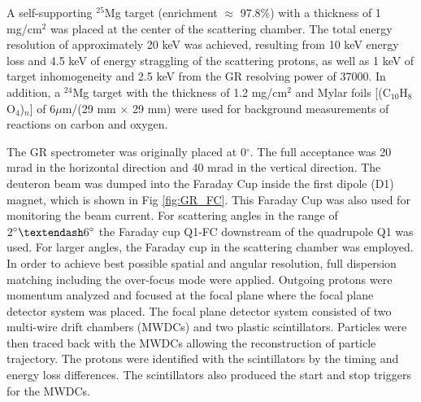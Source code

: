 A self-supporting $^{25}$Mg target (enrichment $\approx$ 97.8$\%$) with a thickness of 1 mg/cm$^2$ was placed at the center of the scattering chamber. The total energy resolution of approximately 20 keV was  achieved, resulting from 10 keV energy loss and 4.5 keV of energy straggling of the scattering protons, as well as 1 keV of target inhomogeneity and 2.5 keV from the GR resolving power of 37000. In addition, a $^{24}$Mg target with the thickness of 1.2 mg/cm$^2$ and Mylar foils [(C$_{10}$H$_8$O$_4$)$_n$] of 6$\mu$m/(29 mm $\times$ 29 mm) were used for background measurements of reactions on carbon and oxygen.

The GR spectrometer was originally placed at 0$^\circ$. The full acceptance was 20 mrad in the horizontal direction and 40 mrad in the vertical direction. The deuteron beam was dumped into the Faraday Cup inside the first dipole (D1) magnet, which is shown in Fig \ref{fig:GR_FC}. This Faraday Cup was also used for monitoring the beam current. For scattering angles in the range of $2^\circ \textendash 6 ^\circ$ the Faraday cup Q1-FC downstream of the quadrupole Q1 was used. For larger angles, the Faraday cup in the scattering chamber was employed.
In order to achieve best possible spatial and angular resolution, full dispersion matching\citep{Wakasa200279} including the over-focus mode \citep{FUJITA200217} were applied. Outgoing protons were momentum analyzed and focused at the focal plane where the focal plane detector system was placed. The focal plane detector system consisted of two multi-wire drift chambers (MWDCs)  and two plastic scintillators. Particles were then traced back with  the MWDCs allowing the reconstruction of particle trajectory. The protons were identified with the scintillators by the timing and energy loss differences. The scintillators also produced  the start and stop triggers for the MWDCs.





